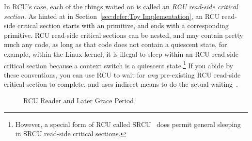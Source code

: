 In RCU's case, each of the things waited on is called an
\emph{RCU read-side critical section}.
As hinted at in
Section~\ref{sec:defer:Toy Implementation}, an RCU read-side critical
section starts with an  primitive, and ends with a
corresponding  primitive.
RCU read-side critical sections can be nested, and may contain pretty
much any code, as long as that code does not contain a quiescent state,
for example, within the Linux kernel, it is illegal to sleep within
an RCU read-side critical section because a context switch is a quiescent
state.\footnote{
	However, a special form of RCU called SRCU~\cite{PaulEMcKenney2006c}
	does permit general sleeping in SRCU read-side critical sections.}
If you abide by these conventions, you can use RCU to wait for \emph{any}
pre-existing RCU read-side critical section to complete, and
 uses indirect means to do the actual
waiting~\cite{MathieuDesnoyers2012URCU,McKenney:2013:SDS:2483852.2483867}.

\begin{figure}
\centering
{}
\caption{RCU Reader and Later Grace Period}
\label{fig:defer:RCU Reader and Later Grace Period}
\end{figure}

